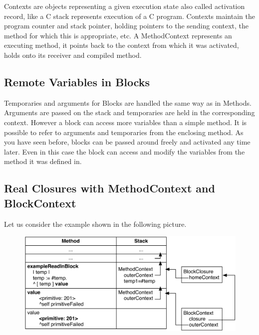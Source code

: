 \documentclass[a4paper,10pt,twoside]{book}
\begin{document}
Contexts are objects representing a given execution state also called activation record, like a C stack represents execution of a C program. Contexts maintain the program counter and stack pointer, holding pointers to the sending context, the method for which this is appropriate, etc. A MethodContext represents an executing method, it points back to the context from which it was activated, holds onto its receiver and compiled method.


\subsection{Remote Variables in Blocks}
Temporaries and arguments for Blocks are handled the same way as in Methods.
Arguments are passed on the stack and temporaries are held in the corresponding context.
However a block can access more variables than a simple method.
It is possible to refer to arguments and temporaries from the enclosing method.
As you have seen before, blocks can be passed around freely and activated any time later.
Even in this case the block can access and modify the variables from the method it was defined in.


\subsection{Real Closures with MethodContext and BlockContext}

Let us consider the example shown in the following picture.

\begin{figure}[H]
\begin{center}
\includegraphics[width=\textwidth]{BlockWithFullClosures}
\end{center}
\end{figure}
\end{document}
